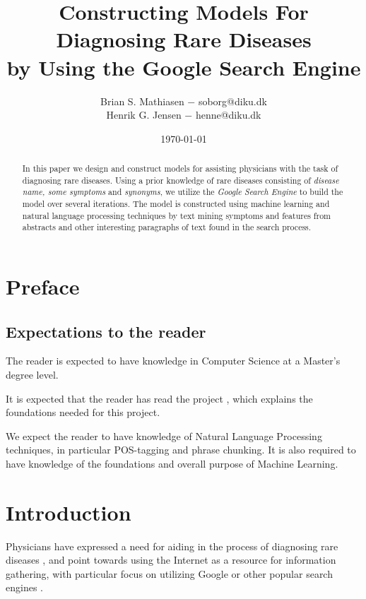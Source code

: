 \documentclass[10pt,letterpaper,final]{article}
\title{Constructing Models For Diagnosing Rare Diseases\\
        \small{by Using the Google Search Engine}}
\author{Brian S. Mathiasen $-$ soborg@diku.dk \\
        Henrik G. Jensen $-$ henne@diku.dk\\
}
\date{\today} %
\begin{document}
\maketitle
\listoffixmes


\begin{abstract}
In this paper we design and construct models for assisting physicians
with the task of diagnosing rare diseases. Using a prior knowledge of
rare diseases consisting of \textit{disease name, some symptoms} and
\textit{synonyms}, we utilize the \textit{Google Search Engine} to build
the model over several iterations. The model is constructed using
machine learning and natural language processing techniques by text
mining symptoms and features from abstracts and other interesting
paragraphs of text found in the search process.

\end{abstract}

\section{Preface}
\subsection{Expectations to the reader}
The reader is expected to have knowledge in Computer Science at a
Master's degree level.

It is expected that the reader has read the project
\cite{jensenandersen}, which explains the foundations needed for this
project.

We expect the reader to have knowledge of Natural Language Processing
techniques, in particular POS-tagging and phrase chunking. It is also
required to have knowledge of the foundations and overall purpose of
Machine Learning.


\section{Introduction}
Physicians have expressed a need for aiding in the process of diagnosing
rare diseases \cite{googlingdiagnosis}, and point towards using the
Internet as a resource for information gathering, with particular focus
on utilizing Google or other popular search engines
\cite{googlechangemedicine} \cite{diagnosissearchengines}.

\end{document}
